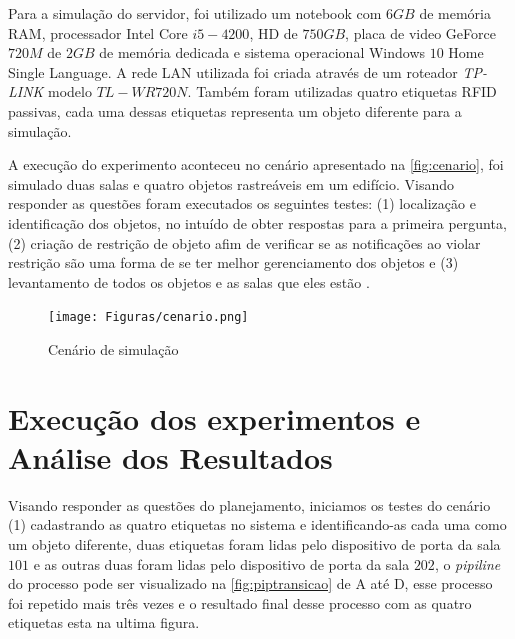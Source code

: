 \par
Para a simulação do servidor, foi utilizado um notebook com $6GB$ de memória RAM, processador Intel Core $i5-4200$, HD de $750GB$, placa de video GeForce $720M$ de $2GB$ de memória dedicada e sistema operacional Windows $10$ Home Single Language. A rede LAN utilizada foi criada através de um roteador \textit{TP-LINK} modelo $TL-WR720N$. Também foram utilizadas quatro etiquetas RFID passivas, cada uma dessas etiquetas representa um objeto diferente para a simulação.

\par
A execução do experimento aconteceu no cenário apresentado na \autoref{fig:cenario}, foi simulado duas salas e quatro objetos rastreáveis em um edifício. Visando responder as questões foram executados os seguintes testes: (1) localização e identificação dos objetos, no intuído de obter respostas para a primeira pergunta, (2) criação de restrição de objeto afim de verificar se as notificações ao violar restrição são uma forma de se ter melhor gerenciamento dos objetos e (3) levantamento de todos os objetos e as salas que eles estão .

\begin{figure}[H]
              \caption{\label{fig:cenario}{Cenário de simulação}}
              \centering
              \texttt{[image: Figuras/cenario.png]}
\end{figure}
\section{Execução dos experimentos e Análise dos Resultados}

 
 Visando responder as questões do planejamento, iniciamos os testes do cenário (1) cadastrando as quatro etiquetas no sistema e identificando-as cada uma como um objeto diferente, duas etiquetas foram lidas pelo dispositivo de porta da sala $101$ e as outras duas foram lidas pelo dispositivo de porta da sala $202$, o \textit{pipiline} do processo pode ser visualizado na \autoref{fig:piptransicao} de A até D, esse processo foi repetido mais três vezes e o resultado final desse processo com as quatro etiquetas esta na ultima figura.

